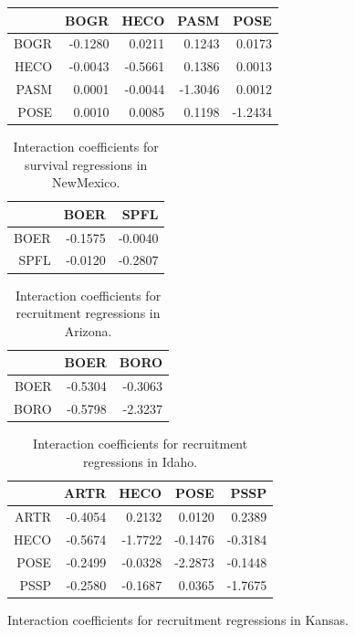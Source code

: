 \documentclass[12pt,]{article}
\begin{document}
\begin{table}[ht]
\begin{tabular}{rrrrr}
  \hline
 & BOGR & HECO & PASM & POSE \\ 
  \hline
BOGR & -0.1280 & 0.0211 & 0.1243 & 0.0173 \\ 
  HECO & -0.0043 & -0.5661 & 0.1386 & 0.0013 \\ 
  PASM & 0.0001 & -0.0044 & -1.3046 & 0.0012 \\ 
  POSE & 0.0010 & 0.0085 & 0.1198 & -1.2434 \\ 
   \hline
\end{tabular}
\end{table}\begin{table}[ht]
\centering
\caption{Interaction coefficients for survival regressions in NewMexico.} 
\begin{tabular}{rrr}
  \hline
 & BOER & SPFL \\ 
  \hline
BOER & -0.1575 & -0.0040 \\ 
  SPFL & -0.0120 & -0.2807 \\ 
   \hline
\end{tabular}
\end{table}\begin{table}[ht]
\centering
\caption{Interaction coefficients for recruitment regressions in Arizona.} 
\begin{tabular}{rrr}
  \hline
 & BOER & BORO \\ 
  \hline
BOER & -0.5304 & -0.3063 \\ 
  BORO & -0.5798 & -2.3237 \\ 
   \hline
\end{tabular}
\end{table}\begin{table}[ht]
\centering
\caption{Interaction coefficients for recruitment regressions in Idaho.} 
\begin{tabular}{rrrrr}
  \hline
 & ARTR & HECO & POSE & PSSP \\ 
  \hline
ARTR & -0.4054 & 0.2132 & 0.0120 & 0.2389 \\ 
  HECO & -0.5674 & -1.7722 & -0.1476 & -0.3184 \\ 
  POSE & -0.2499 & -0.0328 & -2.2873 & -0.1448 \\ 
  PSSP & -0.2580 & -0.1687 & 0.0365 & -1.7675 \\ 
   \hline
\end{tabular}
\end{table}\begin{table}[ht]
\centering
\caption{Interaction coefficients for recruitment regressions in Kansas.} 

\end{table}
\end{document}
